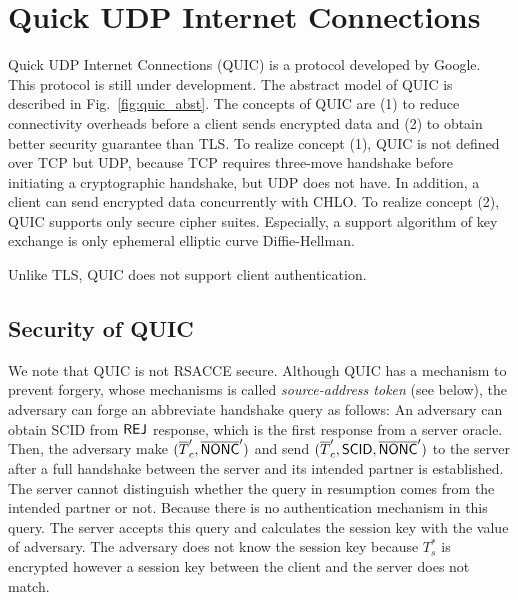 \section{Quick UDP Internet Connections} \label{sec:quic}

Quick UDP Internet Connections (QUIC) is a protocol developed by Google. This protocol is still under development. The abstract model of QUIC is described in Fig.~\ref{fig:quic_abst}. The concepts of QUIC are (1) to reduce connectivity overheads before a client sends encrypted data and (2) to obtain better security guarantee than TLS.
To realize concept (1), QUIC is not defined over TCP but UDP, because TCP requires three-move handshake before initiating a cryptographic handshake, but UDP does not have. In addition, a client can send encrypted data concurrently with CHLO.
To realize concept (2), QUIC supports only secure cipher suites. Especially, a support algorithm of key exchange is only ephemeral elliptic curve Diffie-Hellman.

Unlike TLS, QUIC does not support client authentication.

\subsection{Security of QUIC} \label{sec:quic_detail}




We note that QUIC is not RSACCE secure.
Although QUIC has a mechanism to prevent forgery,
whose mechanisms is called \textit{source-address token} (see below),
the adversary can forge an abbreviate handshake query as follows:
An adversary can obtain SCID from $\mathsf{REJ}$ response,
which is the first response from a server oracle.
Then, the adversary make $(\overline{T}_c^{\prime}, \overline{\mathsf{NONC}}^{\prime})$
and send $(\overline{T}_c^{\prime}, \mathsf{SCID}, \overline{\mathsf{NONC}}^{\prime})$ to the
server after a full handshake between the server and its intended partner is established.
The server cannot distinguish whether the query in resumption comes from
the intended partner or not. Because there is no authentication
mechanism in this query. The server accepts this query and calculates
the session key with the value of adversary. The adversary does not
know the session key because $T_s^{\ast}$ is encrypted however a
session key between the client and the server does not match.

